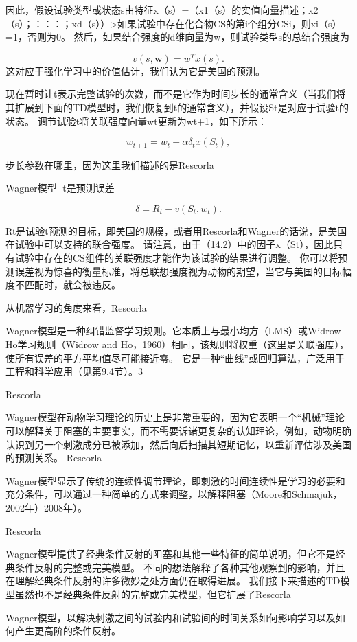 {{{{{{因此，假设试验类型或状态s由特征x（s）=（x1（s）的实值向量描述；x2（s）；：：：；xd（s））>如果试验中存在化合物CS的第i个组分CSi，则xi（s）=1，否则为0。
然后，如果结合强度的d维向量为w，则试验类型s的总结合强度为

\begin{equation}\label{key}
	v(s, \textbf{w}) = 
		w^T x(s).
\end{equation}
这对应于强化学习中的价值估计，我们认为它是美国的预测。

现在暂时让t表示完整试验的次数，而不是它作为时间步长的通常含义（当我们将其扩展到下面的TD模型时，我们恢复到t的通常含义），并假设St是对应于试验t的状态。
调节试验t将关联强度向量wt更新为wt+1，如下所示：

\begin{equation}\label{key}
	w_{t+1} = w_t + \alpha \delta_t x(S_t),
\end{equation}

步长参数在哪里，因为这里我们描述的是Rescorla{Wagner模型| t是预测误差
	
\begin{equation}\label{key}
	\delta = R_t - v (S_t, w_t).
\end{equation}


Rt是试验t预测的目标，即美国的规模，或者用Rescorla和Wagner的话说，是美国在试验中可以支持的联合强度。
请注意，由于（14.2）中的因子x（St），因此只有试验中存在的CS组件的关联强度才能作为该试验的结果进行调整。
你可以将预测误差视为惊喜的衡量标准，将总联想强度视为动物的期望，当它与美国的目标幅度不匹配时，就会被违反。


从机器学习的角度来看，Rescorla{Wagner模型是一种纠错监督学习规则。它本质上与最小均方（LMS）或Widrow-Ho学习规则（Widrow and Ho，1960）相同，该规则将权重（这里是关联强度），使所有误差的平方平均值尽可能接近零。
它是一种“曲线”或回归算法，广泛用于工程和科学应用（见第9.4节）。3


Rescorla{Wagner模型在动物学习理论的历史上是非常重要的，因为它表明一个“机械”理论可以解释关于阻塞的主要事实，而不需要诉诸更复杂的认知理论，例如，动物明确认识到另一个刺激成分已被添加，然后向后扫描其短期记忆，以重新评估涉及美国的预测关系。
Rescorla{Wagner模型显示了传统的连续性调节理论，即刺激的时间连续性是学习的必要和充分条件，可以通过一种简单的方式来调整，以解释阻塞（Moore和Schmajuk，2002年）2008年）。
	
	
Rescorla{Wagner模型提供了经典条件反射的阻塞和其他一些特征的简单说明，但它不是经典条件反射的完整或完美模型。
不同的想法解释了各种其他观察到的影响，并且在理解经典条件反射的许多微妙之处方面仍在取得进展。
我们接下来描述的TD模型虽然也不是经典条件反射的完整或完美模型，但它扩展了Rescorla{Wagner模型，以解决刺激之间的试验内和试验间的时间关系如何影响学习以及如何产生更高阶的条件反射。
	

}}}}}}}}}}}}
